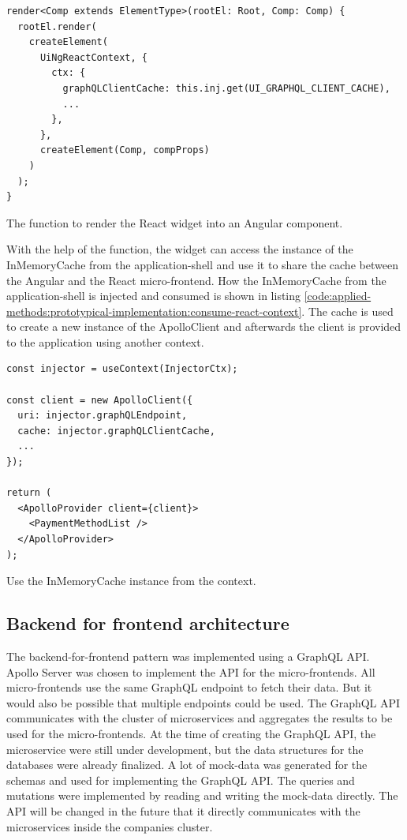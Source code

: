 \ifshowListings
\begin{listing}[H]
    \begin{verbatim}
render<Comp extends ElementType>(rootEl: Root, Comp: Comp) {
  rootEl.render(
    createElement(
      UiNgReactContext, {
        ctx: {
          graphQLClientCache: this.inj.get(UI_GRAPHQL_CLIENT_CACHE),
          ...
        },
      },
      createElement(Comp, compProps)
    )
  );
}
    \end{verbatim}
    \caption{The function to render the React widget into an Angular component.}\label{code:applied-methods:prototypical-implementation:render-react-component-with-context}
\end{listing}
\fi

\noindent With the help of the function, the widget can access the instance of the InMemoryCache from the application-shell and use it to share the cache between the Angular and the React micro-frontend. How the InMemoryCache from the application-shell is injected and consumed is shown in listing \ref{code:applied-methods:prototypical-implementation:consume-react-context}. The cache is used to create a new instance of the ApolloClient and afterwards the client is provided to the application using another context.

\ifshowListings
\begin{listing}[H]
    \begin{verbatim}
const injector = useContext(InjectorCtx);

const client = new ApolloClient({
  uri: injector.graphQLEndpoint,
  cache: injector.graphQLClientCache,
  ...
});

return (
  <ApolloProvider client={client}>
    <PaymentMethodList />
  </ApolloProvider>
);

    \end{verbatim}
    \caption{Use the InMemoryCache instance from the context.}\label{code:applied-methods:prototypical-implementation:consume-react-context}
\end{listing}
\fi

\subsection{Backend for frontend architecture}

The backend-for-frontend pattern was implemented using a GraphQL API. Apollo Server was chosen to implement the API for the micro-frontends. All micro-frontends use the same GraphQL endpoint to fetch their data. But it would also be possible that multiple endpoints could be used. The GraphQL API communicates with the cluster of microservices and aggregates the results to be used for the micro-frontends. At the time of creating the GraphQL API, the microservice were still under development, but the data structures for the databases were already finalized. A lot of mock-data was generated for the schemas and used for implementing the GraphQL API. The queries and mutations were implemented by reading and writing the mock-data directly. The API will be changed in the future that it directly communicates with the microservices inside the companies cluster.
